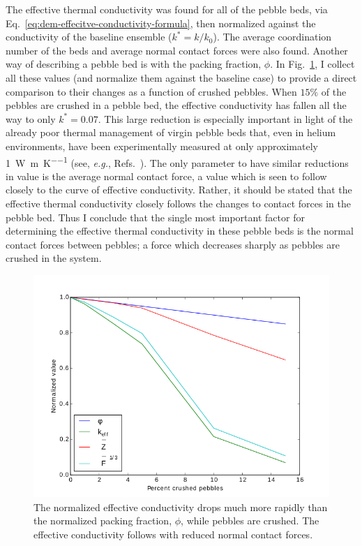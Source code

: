 The effective thermal conductivity was found for all of the pebble beds, via Eq.~\ref{eq:dem-effecitve-conductivity-formula}, then normalized against the conductivity of the baseline ensemble ($k^* = k/k_\text{0}$). The average coordination number of the beds and average normal contact forces were also found. Another way of describing a pebble bed is with the packing fraction, $\phi$. In Fig.~\ref{fig:packing-fraction}, I collect all these values (and normalize them against the baseline case) to provide a direct comparison to their changes as a function of crushed pebbles. When $15\%$ of the pebbles are crushed in a pebble bed, the effective conductivity has fallen all the way to only $k^*=0.07$. This large reduction is especially important in light of the already poor thermal management of virgin pebble beds that, even in helium environments, have been experimentally measured at only approximately \SI{1}{\watt\per\meter\per\kelvin} (see, \textit{ e.g.}, Refs.~\cite{Reimann:2002mi, Piazza2002811}). The only parameter to have similar reductions in value is the average normal contact force, a value which is seen to follow closely to the curve of effective conductivity. Rather, it should be stated that the effective thermal conductivity closely follows the changes to contact forces in the pebble bed. Thus I conclude that the single most important factor for determining the effective thermal conductivity in these pebble beds is the normal contact forces between pebbles; a force which decreases sharply as pebbles are crushed in the system.

\begin{figure}[!ht]
	\centering
	\includegraphics[width=\singleimagewidth]{chapters/figures/kEff_packingFraction}
	\caption{The normalized effective conductivity drops much more rapidly than the normalized packing fraction, $\phi$, while pebbles are crushed. The effective conductivity follows with reduced normal contact forces.}
\label{fig:packing-fraction}
\end{figure}


